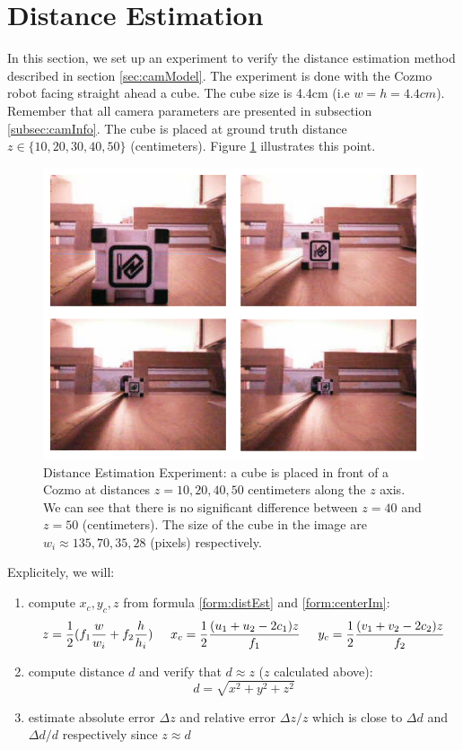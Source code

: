 \section{Distance Estimation}
\label{sec:distEstimExp}
In this section, we set up an experiment to verify the distance estimation method described in section \ref{sec:camModel}. The experiment is done with the Cozmo robot facing straight ahead a cube. The cube size is 4.4cm (i.e $w = h = 4.4cm$). Remember that all camera parameters are presented in subsection \ref{subsec:camInfo}. The cube is placed at ground truth distance $z \in \{10, 20, 30, 40, 50\}$ (centimeters). Figure \ref{fig:distEstim} illustrates this point. 

\begin{figure}[tb]
	\centering
	\includegraphics[width=0.6\hsize]{./figures/distEstim}
	\caption{Distance Estimation Experiment: a cube is placed in front of a Cozmo at distances $z = {10, 20, 40, 50}$ centimeters along the $z$ axis. We can see that there is no significant difference between $z = 40$ and $z = 50$ (centimeters). The size of the cube in the image are $w_i \approx {135, 70, 35, 28}$ (pixels) respectively.}
	\label{fig:distEstim}
\end{figure}

Explicitely, we will:
\begin{enumerate}
	\item compute $x_c, y_c, z$ from formula \ref{form:distEst} and \ref{form:centerIm}:
	\begin{align*}
	z = \frac{1}{2} (f_1 \frac{w}{w_i} + f_2 \frac{h}{h_i}) \hspace{0.5cm}
	x_c = \frac{1}{2}\frac{(u_1 + u_2 - 2  c_1)z}{f_1} \hspace{0.5cm} y_c = \frac{1}{2}\frac{(v_1 + v_2 - 2c_2)z}{f_2}
	\end{align*}
	\item compute distance $d$ and verify that $d \approx z$ ($z$ calculated above):
	$$d = \sqrt{x^2 + y^2 + z^2}$$
	\item estimate absolute error $\Delta z$ and relative error $\Delta z / z$ which is close to $\Delta d$ and $\Delta d / d$ respectively since $z \approx d$
\end{enumerate} 

